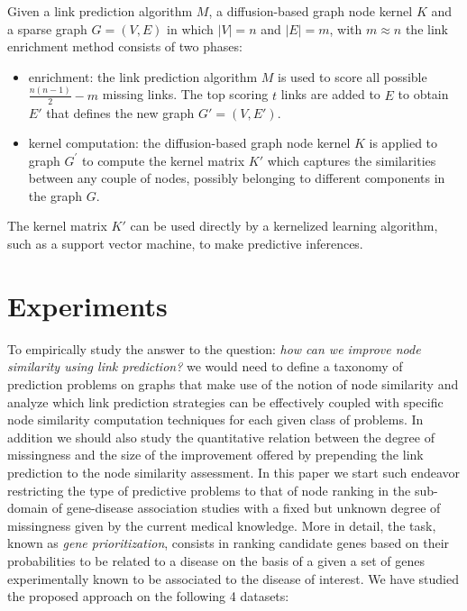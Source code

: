 Given a link prediction algorithm $M$, a diffusion-based graph node kernel $K$ and a sparse graph $G=(V, E)$ in which $|V| = n$ and $|E| = m$, with $m \approx n$ the link enrichment method consists of two phases:

\begin{itemize}

\item enrichment: the link prediction algorithm $M$ is used to score all possible $\frac{n(n-1)}{2}-m$ missing links. The top scoring $t$ links are added to $E$ to obtain $E'$ that defines the new graph $G'=(V,E')$.

\item kernel computation: the diffusion-based graph node kernel $K$ is applied to graph $G^{'}$ to compute the kernel matrix $K'$ which captures the similarities between any couple of nodes, possibly belonging to different components in the graph $G$. 
\end{itemize}

The kernel matrix $K'$ can be used directly by a kernelized learning algorithm, such as a support vector machine, to make predictive inferences.
\section{Experiments}
\label{evaluation} 

To empirically study the answer to the question: {\em how can we improve node
similarity using link prediction?} we would need to define a taxonomy of
prediction problems on graphs that make use of the notion of node similarity
and analyze which link prediction strategies can be effectively coupled with
specific node similarity computation techniques for each given class of
problems. In addition we should also study the quantitative relation between
the degree of missingness and the size of the improvement offered by
prepending the link prediction to the node similarity assessment. In this
paper we start such endeavor restricting the type of predictive problems to
that of node ranking in the sub-domain of gene-disease association studies
with a fixed but unknown degree of missingness given by the current medical
knowledge. More in detail, the task, known as {\em gene prioritization},
consists in ranking candidate genes based on their probabilities to be related
to a disease on the basis of a given a set of genes experimentally known to be
associated to the disease of interest. We have studied the proposed approach on the following 4 datasets:

